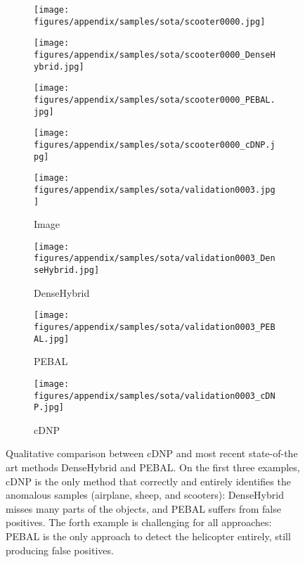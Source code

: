 \documentclass[10pt,twocolumn,letterpaper]{article}
\begin{document}
\begin{figure}[h!]
    \begin{subfigure}[b]{0.110\textwidth}
        \centering
        \texttt{[image: figures/appendix/samples/sota/scooter0000.jpg]}
    \end{subfigure}
    \begin{subfigure}[b]{0.110\textwidth}
        \centering
        \texttt{[image: figures/appendix/samples/sota/scooter0000\_DenseHybrid.jpg]}
    \end{subfigure}
    \begin{subfigure}[b]{0.110\textwidth}
        \centering
        \texttt{[image: figures/appendix/samples/sota/scooter0000\_PEBAL.jpg]}
    \end{subfigure}
    \begin{subfigure}[b]{0.110\textwidth}
        \centering
        \texttt{[image: figures/appendix/samples/sota/scooter0000\_cDNP.jpg]}
    \end{subfigure}

    \begin{subfigure}[b]{0.110\textwidth}
        \centering
        \texttt{[image: figures/appendix/samples/sota/validation0003.jpg]}
        \caption*{Image}
    \end{subfigure}
    \begin{subfigure}[b]{0.110\textwidth}
        \centering
        \texttt{[image: figures/appendix/samples/sota/validation0003\_DenseHybrid.jpg]}
        \caption*{DenseHybrid}
    \end{subfigure}
    \begin{subfigure}[b]{0.110\textwidth}
        \centering
        \texttt{[image: figures/appendix/samples/sota/validation0003\_PEBAL.jpg]}
        \caption*{PEBAL}
    \end{subfigure}
    \begin{subfigure}[b]{0.110\textwidth}
        \centering
        \texttt{[image: figures/appendix/samples/sota/validation0003\_cDNP.jpg]}
        \caption*{cDNP}
    \end{subfigure}
    
    \caption{Qualitative comparison between cDNP and most recent state-of-the art methods DenseHybrid and PEBAL. On the first three examples, cDNP is the only method that correctly and entirely identifies the anomalous samples (airplane, sheep, and scooters): DenseHybrid misses many parts of the objects, and PEBAL suffers from false positives. The forth example is challenging for all approaches: PEBAL is the only approach to detect the helicopter entirely, still producing false positives.}
    
    \label{fig:sota_quali}
\end{figure} 
\end{document}

